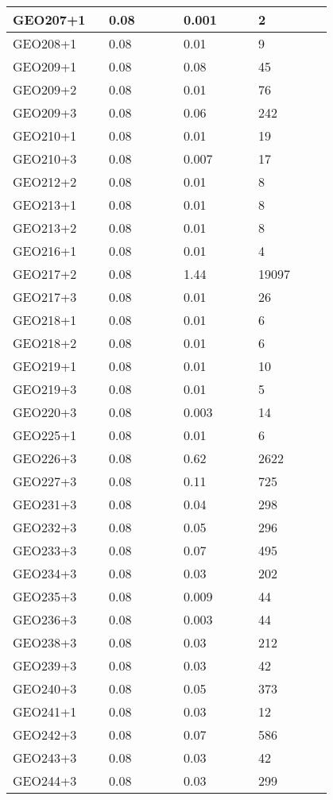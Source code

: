 \begin{longtable}[H]{|p{0.2\linewidth}|p{0.2\linewidth}|p{0.2\linewidth}|p{0.2\linewidth}|}
\hline
GEO207+1 & 0.08 & 0.001 & 2  \\
\hline
GEO208+1 & 0.08 & 0.01 & 9 \\
\hline
GEO209+1 & 0.08 & 0.08 & 45 \\
\hline
GEO209+2 & 0.08 & 0.01 & 76 \\
\hline
GEO209+3 & 0.08 & 0.06 & 242 \\
\hline
GEO210+1 & 0.08 & 0.01 & 19 \\
\hline
GEO210+3 & 0.08 & 0.007 & 17 \\
\hline
GEO212+2 & 0.08 & 0.01 & 8 \\
\hline
GEO213+1 & 0.08 & 0.01 & 8 \\
\hline
GEO213+2 & 0.08 & 0.01 & 8 \\
\hline
GEO216+1 & 0.08 & 0.01 & 4 \\
\hline
GEO217+2 & 0.08 & 1.44 & 19097 \\
\hline
GEO217+3 & 0.08 & 0.01 & 26 \\
\hline
GEO218+1 & 0.08 & 0.01 & 6 \\
\hline
GEO218+2 & 0.08 & 0.01 & 6 \\
\hline
GEO219+1 & 0.08 & 0.01 & 10 \\
\hline
GEO219+3 & 0.08 & 0.01 & 5 \\
\hline
GEO220+3 & 0.08 & 0.003 & 14 \\
\hline
GEO225+1 & 0.08 & 0.01 & 6 \\
\hline
GEO226+3 & 0.08 & 0.62 & 2622 \\
\hline
GEO227+3 & 0.08 & 0.11 & 725 \\
\hline
GEO231+3 & 0.08 & 0.04 & 298 \\
\hline
GEO232+3 & 0.08 & 0.05 & 296 \\
\hline
GEO233+3 & 0.08 & 0.07 & 495 \\
\hline
GEO234+3 & 0.08 & 0.03 & 202 \\
\hline
GEO235+3 & 0.08 & 0.009 & 44 \\
\hline
GEO236+3 & 0.08 & 0.003 & 44 \\
\hline
GEO238+3 & 0.08 & 0.03 & 212 \\
\hline
GEO239+3 & 0.08 & 0.03 & 42 \\
\hline
GEO240+3 & 0.08 & 0.05 & 373 \\
\hline
GEO241+1 & 0.08 & 0.03 & 12 \\
\hline
GEO242+3 & 0.08 & 0.07 & 586 \\
\hline
GEO243+3 & 0.08 & 0.03 & 42 \\
\hline
GEO244+3 & 0.08 & 0.03 & 299 \\

\end{longtable}
